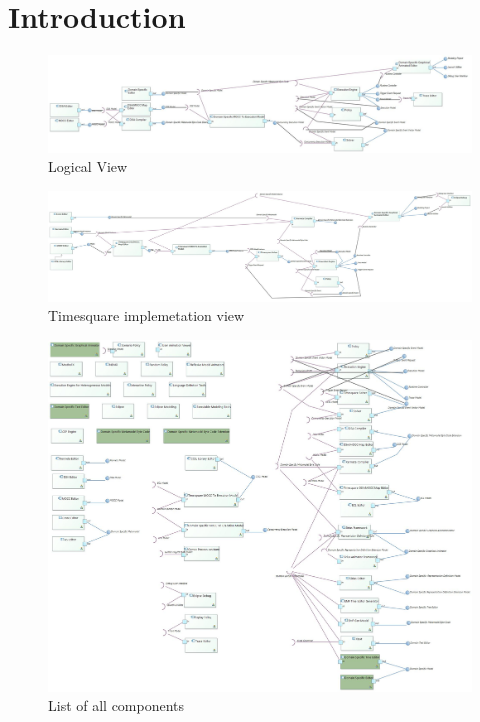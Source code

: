 \documentclass{gemoc} %
\begin{document}
\section{Introduction}
\begin{figure}[htp]
	\begin{center}
	\includegraphics*[trim=0.0cm 0.0cm 0cm 0.0cm, clip=true, angle=90, totalheight=0.9\textheight]{../images/Logical View.jpg}
	\caption{Logical View}
	\label{fig:LogicalView}
	\end{center}
\end{figure}
\begin{figure}[htp]
	\begin{center}
	\includegraphics*[trim=0.0cm 0.0cm 0cm 0.0cm, clip=true, angle=90, totalheight=0.9\textheight]{../images/TimesquareImplementation.jpg}
	\caption{Timesquare implemetation view}
	\label{fig:TimesquareImplementation}
	\end{center}
\end{figure}
\begin{figure}[htp]
	\begin{center}
	\includegraphics*[trim=0.0cm 0.0cm 0cm 0.0cm, clip=true, width=1.0\linewidth]{../images/All Components list.jpg}
	\caption{List of all components}
	\label{fig:AllComponentList}
	\end{center}
\end{figure}
\end{document}
